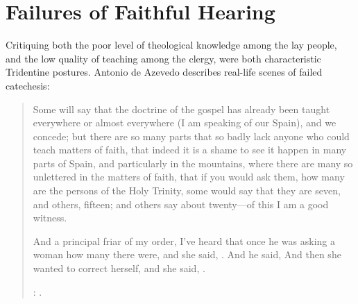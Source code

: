 \section{Failures of Faithful Hearing}

Critiquing both the poor level of theological knowledge among the lay people, and the low quality of teaching among the clergy, were both characteristic Tridentine postures.
Antonio de Azevedo describes real-life scenes of failed catechesis:
\begin{quotation}
  Some will say that the doctrine of the gospel has already been taught everywhere or almost everywhere (I am speaking of our Spain), and we concede;
  but there are so many parts that so badly lack anyone who could teach matters of faith,
  that indeed it is a shame to see it happen in many parts of Spain, and particularly in the  mountains,
  where there are many so unlettered  in the matters of faith,
  that if you would ask them, how many are the persons of the Holy Trinity, some would say that they are seven, and others, fifteen; and others say about twenty---of this I am a good witness.

  And a principal friar of my order, I've heard that once he was asking a woman how many  there were, and she said, .
  And he said, 
  And then she wanted to correct herself, and she said, .%
  \begin{Footnote}
    \Autocite[26]{Azevedo:Catecismo}:
    .
  \end{Footnote}
\end{quotation}

